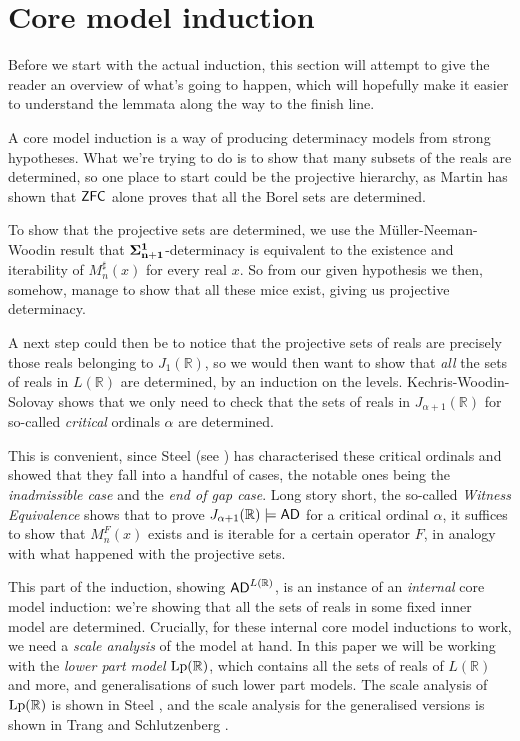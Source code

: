 \documentclass[../../main]{subfiles}
\begin{document}


\section{Core model induction}

Before we start with the actual induction, this section will attempt to give the reader an overview of what's going to happen, which will hopefully make it easier to understand the lemmata along the way to the finish line.

\qquad A core model induction is a way of producing determinacy models from strong hypotheses. What we're trying to do is to show that many subsets of the reals are determined, so one place to start could be the projective hierarchy, as Martin has shown that $\textsf{ZFC}$ alone proves that all the Borel sets are determined.

\qquad To show that the projective sets are determined, we use the M\" uller-Neeman-Woodin result that $\bf\Sigma^1_{n+1}$-determinacy is equivalent to the existence and iterability of $M_n^\sharp(x)$ for every real $x$. So from our given hypothesis we then, somehow, manage to show that all these mice exist, giving us projective determinacy.

\qquad A next step could then be to notice that the projective sets of reals are precisely those reals belonging to $J_1(\mathbb R)$, so we would then want to show that \textit{all} the sets of reals in $L(\mathbb R)$ are determined, by an induction on the levels. Kechris-Woodin-Solovay  shows that we only need to check that the sets of reals in $J_{\alpha+1}(\mathbb R)$ for so-called \textit{critical} ordinals $\alpha$ are determined.

\qquad This is convenient, since Steel (see \cite{scalesinL(R)}) has characterised these critical ordinals and showed that they fall into a handful of cases, the notable ones being the \textit{inadmissible case} and the \textit{end of gap case}. Long story short, the so-called \textit{Witness Equivalence} shows that to prove $J_{\alpha+1}(\mathbb R)\models\textsf{AD}$ for a critical ordinal $\alpha$, it suffices to show that $M_n^F(x)$ exists and is iterable for a certain operator $F$, in analogy with what happened with the projective sets.

\qquad This part of the induction, showing $\textsf{AD}^{L{(\mathbb R)}}$, is an instance of an \textit{internal} core model induction: we're showing that all the sets of reals in some fixed inner model are determined. Crucially, for these internal core model inductions to work, we need a \textit{scale analysis} of the model at hand. In this paper we will be working with the \textit{lower part model} $\operatorname{Lp}(\mathbb R)$, which contains all the sets of reals of $L(\mathbb R)$ and more, and generalisations of such lower part models. The scale analysis of $\operatorname{Lp}(\mathbb R)$ is shown in Steel , and the scale analysis for the generalised versions is shown in Trang and Schlutzenberg .
\end{document}
